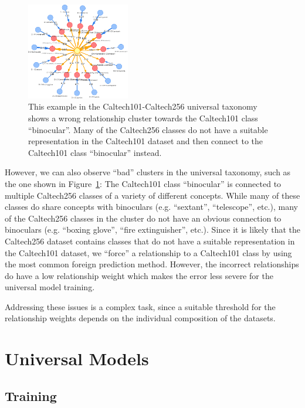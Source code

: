 \begin{figure}[H]
      \centering
      \includegraphics[width=0.4\textwidth]{figures/bad_taxonomy.png}

      \caption{This example in the Caltech101-Caltech256 universal taxonomy shows a wrong relationship
            cluster towards the Caltech101 class \enquote{binocular}. Many of the Caltech256 classes
            do not have a suitable representation in the Caltech101 dataset
            and then connect to the Caltech101 class \enquote{binocular} instead.}
      \label{fig:bad_taxonomy}
\end{figure}

However, we can also observe \enquote{bad} clusters in the universal taxonomy,
such as the one shown in Figure~\ref{fig:bad_taxonomy}:
The Caltech101 class \enquote{binocular} is connected to multiple Caltech256 classes
of a variety of different concepts.
While many of these classes do share concepts with binoculars (e.g. \enquote{sextant}, \enquote{telescope}, etc.),
many of the Caltech256 classes in the cluster do not have an obvious connection to binoculars
(e.g. \enquote{boxing glove}, \enquote{fire extinguisher}, etc.).
Since it is likely that the Caltech256 dataset contains classes that do not have a suitable representation in the Caltech101 dataset,
we \enquote{force} a relationship to a Caltech101 class by using the most common foreign prediction method.
However, the incorrect relationships do have a low relationship weight which makes
the error less severe for the universal model training.

Addressing these issues is a complex task, since a suitable threshold for the relationship weights
depends on the individual composition of the datasets.


\section{Universal Models} \label{sec:universal_models}

\subsection{Training}

